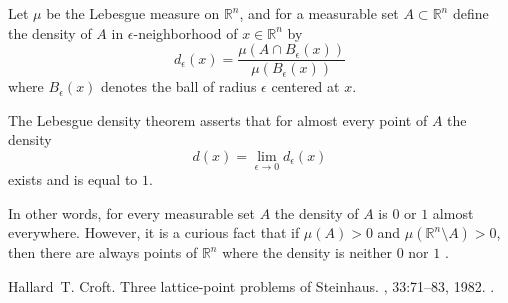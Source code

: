 \documentclass[12pt]{article}
\begin{document}
Let $\mu$ be the Lebesgue measure on $\mathbb{R}^n$, and for a
measurable set $A\subset \mathbb{R}^n$ define the density of $A$ in
$\epsilon$-neighborhood of $x\in\mathbb{R}^n$ by
\begin{equation*}
d_\epsilon(x)=\frac{\mu(A\cap B_\epsilon(x))}{\mu(B_\epsilon(x))}
\end{equation*}
where $B_\epsilon(x)$ denotes the ball of radius $\epsilon$
centered at $x$.

The Lebesgue density theorem asserts that for almost every point of
$A$ the density
\begin{equation*}\label{eq:densdef}
d(x)=\lim_{\epsilon\to 0} d_{\epsilon}(x)
\end{equation*}
exists and is equal to $1$.

In other words, for every measurable set $A$ the density of $A$ is
$0$ or $1$ almost everywhere. However, it is a curious fact that
if $\mu(A)>0$ and $\mu(\mathbb{R}^n\setminus A)>0$, then there are
always points of $\mathbb{R}^n$ where the density is neither $0$
nor $1$ \cite[Lemma 4]{cite:croft_latticepts}.

\begin{thebibliography}{1}

Hallard~T. Croft.
\newblock Three lattice-point problems of {Steinhaus}.
, 33:71--83, 1982.
\newblock {}.

\end{thebibliography}
\end{document}
